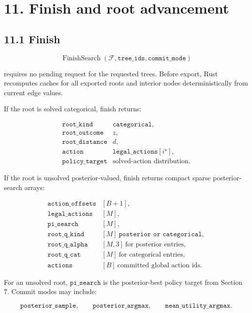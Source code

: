\documentclass[11pt]{article}
\newcommand{\Forest}{\mathcal{F}}
\newcommand{\FinishSearch}{\operatorname{FinishSearch}}
\begin{document}
\section*{11. Finish and root advancement}

\subsection*{11.1 Finish}

\[
\FinishSearch(\Forest,\texttt{tree\_ids},\texttt{commit\_mode})
\]

requires no pending request for the requested trees. Before export, Rust
recomputes caches for all exported roots and interior nodes deterministically
from current edge values.

If the root is solved categorical, finish returns:

\[
\begin{array}{ll}
\texttt{root\_kind}      & \texttt{categorical},\\
\texttt{root\_outcome}   & z,\\
\texttt{root\_distance}  & d,\\
\texttt{action}          & \texttt{legal\_actions}[i^\star],\\
\texttt{policy\_target}  & \text{solved-action distribution}.
\end{array}
\]

If the root is unsolved posterior-valued, finish returns compact sparse
posterior-search arrays:

\[
\begin{array}{ll}
\texttt{action\_offsets} & [B+1],\\
\texttt{legal\_actions}  & [M],\\
\texttt{pi\_search}      & [M],\\
\texttt{root\_q\_kind}   & [M]\ \texttt{posterior or categorical},\\
\texttt{root\_q\_alpha}  & [M,3]\ \text{for posterior entries},\\
\texttt{root\_q\_cat}    & [M]\ \text{for categorical entries},\\
\texttt{actions}         & [B]\ \text{committed global action ids}.
\end{array}
\]

For an unsolved root, \(\texttt{pi\_search}\) is the posterior-best policy target
from Section 7. Commit modes may include:

\[
\texttt{posterior\_sample},
\qquad
\texttt{posterior\_argmax},
\qquad
\texttt{mean\_utility\_argmax}.
\]
\end{document}
